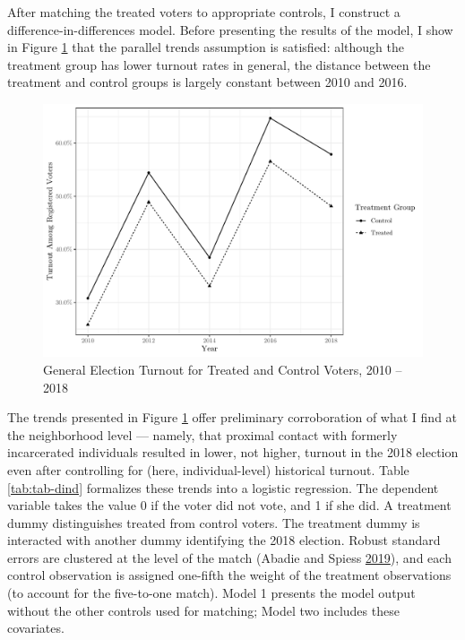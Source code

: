 \documentclass[
  12pt,
]{article}
\begin{document}
After matching the treated voters to appropriate controls, I construct a difference-in-differences model. Before presenting the results of the model, I show in Figure \ref{fig:dind} that the parallel trends assumption is satisfied: although the treatment group has lower turnout rates in general, the distance between the treatment and control groups is largely constant between 2010 and 2016.

\begin{figure}[H]

{\centering \includegraphics{write_files/figure-latex/dind-1} 

}

\caption{\label{fig:dind}General Election Turnout for Treated and Control Voters, 2010 -- 2018}\label{fig:dind}
\end{figure}

The trends presented in Figure \ref{fig:dind} offer preliminary corroboration of what I find at the neighborhood level --- namely, that proximal contact with formerly incarcerated individuals resulted in lower, not higher, turnout in the 2018 election even after controlling for (here, individual-level) historical turnout. Table \ref{tab:tab-dind} formalizes these trends into a logistic regression. The dependent variable takes the value 0 if the voter did not vote, and 1 if she did. A treatment dummy distinguishes treated from control voters. The treatment dummy is interacted with another dummy identifying the 2018 election. Robust standard errors are clustered at the level of the match (Abadie and Spiess \protect\hyperlink{ref-Abadie2019}{2019}), and each control observation is assigned one-fifth the weight of the treatment observations (to account for the five-to-one match). Model 1 presents the model output without the other controls used for matching; Model two includes these covariates.
\end{document}
